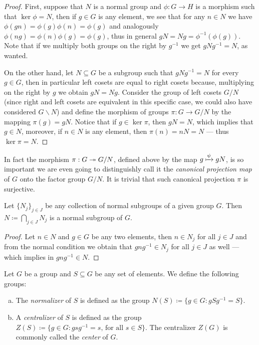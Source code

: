 \begin{proof}
First, suppose that \(N\) is a normal group and \(\phi: G \to H\) is a morphism
such that \(\ker \phi = N\), then if \(g \in G\) is any element, we see that for
any \(n \in N\) we have \(\phi(g n) = \phi(g) \phi(n) = \phi(g)\) and
analogously \(\phi(n g) = \phi(n) \phi(g) = \phi(g)\), thus in general \(g N = N
g = \phi^{-1}(\phi(g))\). Note that if we multiply both groups on the right by
\(g^{-1}\) we get \(g N g^{-1} = N\), as wanted.

On the other hand, let \(N \subseteq G\) be a subgroup such that \(g N g^{-1} =
N\) for every \(g \in G\), then in particular left cosets are equal to right
cosets because, multiplying on the right by \(g\) we obtain \(g N = N
g\). Consider the group of left cosets \(G/N\) (since right and left cosets are
equivalent in this specific case, we could also have considered \(G \backslash
N\)) and define the morphism of groups \(\pi: G \to G/N\) by the mapping
\(\pi(g) = g N\). Notice that if \(g \in \ker \pi\), then \(g N = N\), which
implies that \(g \in N\), moreover, if \(n \in N\) is any element, then
\(\pi(n) = n N = N\) --- thus \(\ker \pi = N\).
\end{proof}

In fact the morphism \(\pi: G \twoheadrightarrow G/N\), defined above by the map \(g \xmapsto
\psi g N\), is so important we are even going to distinguishly call it the
\emph{canonical projection map} of \(G\) onto the factor group \(G/N\). It is
trivial that such canonical projection \(\pi\) is surjective.

\begin{corollary}
\label{cor:intersection-normal-subgroups}
Let \(\{N_{j}\}_{j \in J}\) be any collection of normal subgroups of a given
group \(G\). Then \(N \coloneq \bigcap_{j \in J} N_j\) is a normal subgroup of
\(G\).
\end{corollary}

\begin{proof}
Let \(n \in N\) and \(g \in G\) be any two elements, then \(n \in N_j\) for all
\(j \in J\) and from the normal condition we obtain that \(g n g^{-1} \in N_j\)
for all \(j \in J\) as well --- which implies in \(g n g^{-1} \in N\).
\end{proof}

\begin{definition}
\label{def:normalizer-centralizer}
Let \(G\) be a group and \(S \subseteq G\) be any set of elements. We define the
following groups:
\begin{enumerate}[(a)]\setlength\itemsep{0em}
\item The \emph{normalizer} of \(S\) is defined as the group \(N(S) \coloneq \{g
  \in G : g S g^{-1} = S\}\).
\item A \emph{centralizer} of \(S\) is defined as the group \(Z(S) \coloneq \{g
  \in G : g s g^{-1} = s \text{, for all } s \in S\}\). The centralizer \(Z(G)\)
  is commonly called the \emph{center} of \(G\).
\end{enumerate}
\end{definition}

